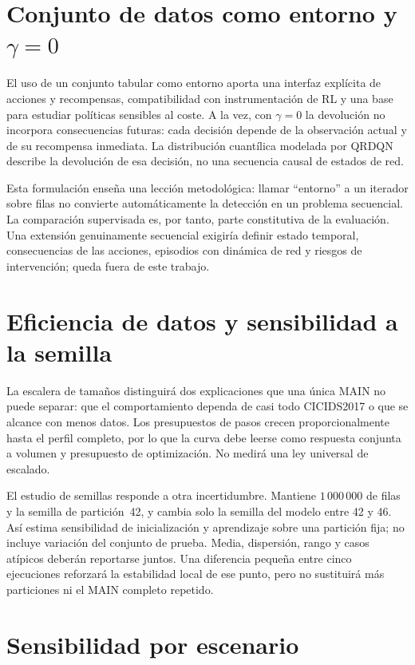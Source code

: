 \section{Conjunto de datos como entorno y $\gamma=0$}

El uso de un conjunto tabular como entorno aporta una interfaz explícita de acciones y recompensas, compatibilidad con instrumentación de RL y una base para estudiar políticas sensibles al coste. A la vez, con $\gamma=0$ la devolución no incorpora consecuencias futuras: cada decisión depende de la observación actual y de su recompensa inmediata. La distribución cuantílica modelada por QRDQN describe la devolución de esa decisión, no una secuencia causal de estados de red.

Esta formulación enseña una lección metodológica: llamar \enquote{entorno} a un iterador sobre filas no convierte automáticamente la detección en un problema secuencial. La comparación supervisada es, por tanto, parte constitutiva de la evaluación. Una extensión genuinamente secuencial exigiría definir estado temporal, consecuencias de las acciones, episodios con dinámica de red y riesgos de intervención; queda fuera de este trabajo.

\section{Eficiencia de datos y sensibilidad a la semilla}

La escalera de tamaños distinguirá dos explicaciones que una única MAIN no puede separar: que el comportamiento dependa de casi todo CICIDS2017 o que se alcance con menos datos. Los presupuestos de pasos crecen proporcionalmente hasta el perfil completo, por lo que la curva debe leerse como respuesta conjunta a volumen y presupuesto de optimización. No medirá una ley universal de escalado.

El estudio de semillas responde a otra incertidumbre. Mantiene $1\,000\,000$ de filas y la semilla de partición~42, y cambia solo la semilla del modelo entre 42 y 46. Así estima sensibilidad de inicialización y aprendizaje sobre una partición fija; no incluye variación del conjunto de prueba. Media, dispersión, rango y casos atípicos deberán reportarse juntos. Una diferencia pequeña entre cinco ejecuciones reforzará la estabilidad local de ese punto, pero no sustituirá más particiones ni el MAIN completo repetido.

\section{Sensibilidad por escenario}

